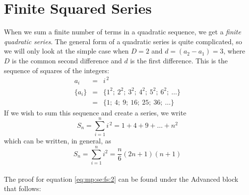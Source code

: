 \section{Finite Squared Series}
When we sum a finite number of terms in a quadratic sequence, we get a \textit{finite
quadratic series}. The general form of a quadratic series is quite complicated,
so we will only look at the simple case when $D=2$ and $d=(a_2 - a_1)=3$, where $D$ is the common second difference and $d$ is the first difference. This is the sequence of squares of the integers:
\begin{eqnarray*}
\label{eq:mp:se:quad:seq}
a_i &=& i^{\,2} \\
\{a_i\} &=& \{1^2; \: 2^2; \: 3^2; \: 4^2; \: 5^2; \: 6^2; \: \ldots \} \\
&=& \{1; \: 4; \: 9; \: 16; \: 25; \: 36; \: \ldots \}
\end{eqnarray*}
If we wish to sum this sequence and create a series, we write
\begin{equation*}
\label{eq:mp:se:fs:sum}
S_n=\sum_{i=1}^n i^{\,2} = 1 + 4 + 9 + \ldots + n^2
\end{equation*}
which can be written, in general, as
\begin{equation}
\label{eq:mp:se:fs:2}
\boxed{S_n = \sum_{i=1}^n i^2 = \frac{n}{6}(2n + 1)(n + 1)}
\end{equation}
\\
The proof for equation \eqref{eq:mp:se:fs:2} can be found under the Advanced block that follows:
\\
